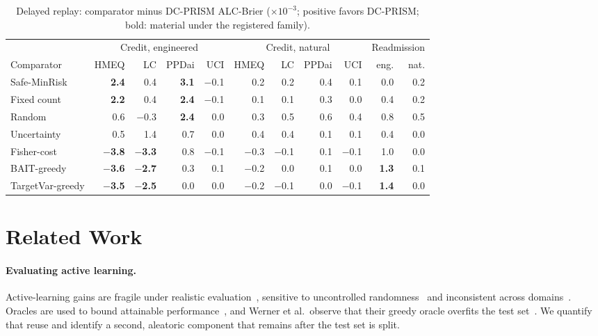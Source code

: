 \documentclass[runningheads]{llncs}
\begin{document}
\begin{table}[t]
\caption{Delayed replay: comparator minus DC-PRISM ALC-Brier ($\times10^{-3}$; positive favors DC-PRISM; bold: material under the registered family).}
\label{tab:replay}
\centering\scriptsize
\setlength{\tabcolsep}{2.4pt}
\begin{tabular}{lrrrrrrrrrr}
\toprule
& \multicolumn{4}{c}{Credit, engineered} & \multicolumn{4}{c}{Credit, natural} & \multicolumn{2}{c}{Readmission} \\
\cmidrule(lr){2-5}\cmidrule(lr){6-9}\cmidrule(lr){10-11}
Comparator & HMEQ & LC & PPDai & UCI & HMEQ & LC & PPDai & UCI & eng. & nat. \\
\midrule
Safe-MinRisk & \textbf{2.4} & 0.4 & \textbf{3.1} & $-$0.1 & 0.2 & 0.2 & 0.4 & 0.1 & 0.0 & 0.2 \\
Fixed count & \textbf{2.2} & 0.4 & \textbf{2.4} & $-$0.1 & 0.1 & 0.1 & 0.3 & 0.0 & 0.4 & 0.2 \\
Random & 0.6 & $-$0.3 & \textbf{2.4} & 0.0 & 0.3 & 0.5 & 0.6 & 0.4 & 0.8 & 0.5 \\
Uncertainty & 0.5 & 1.4 & 0.7 & 0.0 & 0.4 & 0.4 & 0.1 & 0.1 & 0.4 & 0.0 \\
Fisher-cost & \textbf{$-$3.8} & \textbf{$-$3.3} & 0.8 & $-$0.1 & $-$0.3 & $-$0.1 & 0.1 & $-$0.1 & 1.0 & 0.0 \\
BAIT-greedy & \textbf{$-$3.6} & \textbf{$-$2.7} & 0.3 & 0.1 & $-$0.2 & 0.0 & 0.1 & 0.0 & \textbf{1.3} & 0.1 \\
TargetVar-greedy & \textbf{$-$3.5} & \textbf{$-$2.5} & 0.0 & 0.0 & $-$0.2 & $-$0.1 & 0.0 & $-$0.1 & \textbf{1.4} & 0.0 \\
\bottomrule
\end{tabular}
\end{table}

\section{Related Work}
\label{sec:related}
\paragraph{Evaluating active learning.} Active-learning gains are fragile under realistic evaluation~\cite{luth2023navigating}, sensitive to uncontrolled randomness~\cite{ji2023randomness} and inconsistent across domains~\cite{werner2023comparable,werner2024cdalbench}. Oracles are used to bound attainable performance~\cite{werner2024cdalbench,huseljic2026boss}, and Werner et al.\ observe that their greedy oracle overfits the test set~\cite{werner2023comparable}. We quantify that reuse and identify a second, aleatoric component that remains after the test set is split.
\end{document}
